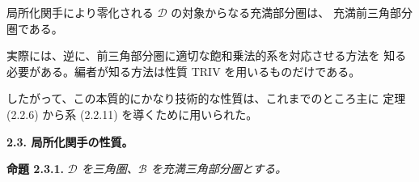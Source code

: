 局所化関手により零化される $\mathcal D$ の対象からなる充満部分圏は、
充満前三角部分圏である。

実際には、逆に、前三角部分圏に適切な飽和乗法的系を対応させる方法を
知る必要がある。編者が知る方法は性質 TRIV を用いるものだけである。

したがって、この本質的にかなり技術的な性質は、これまでのところ主に
定理 (2.2.6) から系 (2.2.11) を導くために用いられた。

\medskip
\noindent\textbf{2.3. 局所化関手の性質。}

\smallskip
\noindent\textbf{命題 2.3.1.}\quad
\itshape $\mathcal D$ を三角圏、$\mathcal B$ を充満三角部分圏とする。\upshape

\endgroup

